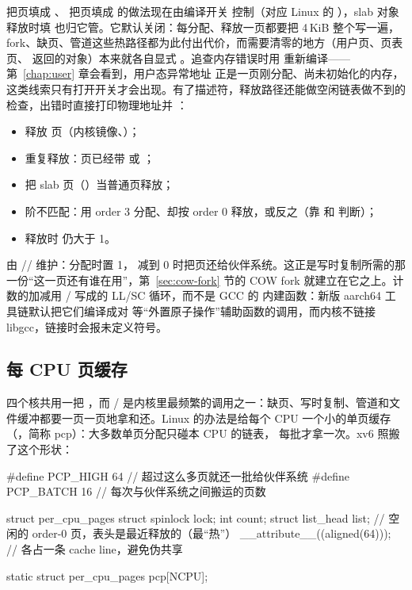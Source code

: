  把页填成 、 把页填成  的做法现在由编译开关  控制（对应 Linux 的 ），slab 对象释放时填  也归它管。它默认关闭：每分配、释放一页都要把 4\,KiB 整个写一遍，fork、缺页、管道这些热路径都为此付出代价，而需要清零的地方（用户页、页表页、 返回的对象）本来就各自显式 。追查内存错误时用  重新编译——第~\ref{chap:user} 章会看到，用户态异常地址  正是一页刚分配、尚未初始化的内存，这类线索只有打开开关才会出现。有了描述符，释放路径还能做空闲链表做不到的检查，出错时直接打印物理地址并 ：

\begin{itemize}
  \item 释放  页（内核镜像、）；
  \item 重复释放：页已经带  或 ；
  \item 把 slab 页（）当普通页释放；
  \item 阶不匹配：用 order 3 分配、却按 order 0 释放，或反之（靠  和  判断）；
  \item 释放时  仍大于 1。
\end{itemize}

 由 // 维护：分配时置 1， 减到 0 时把页还给伙伴系统。这正是写时复制所需的那一份“这一页还有谁在用”，第~\ref{sec:cow-fork} 节的 COW fork 就建立在它之上。计数的加减用 / 写成的 LL/SC 循环，而不是 GCC 的  内建函数：新版 aarch64 工具链默认把它们编译成对  等“外置原子操作”辅助函数的调用，而内核不链接 libgcc，链接时会报未定义符号。

\subsection{每 CPU 页缓存}
\label{sec:pcp}

四个核共用一把 ，而 / 是内核里最频繁的调用之一：缺页、写时复制、管道和文件缓冲都要一页一页地拿和还。Linux 的办法是给每个 CPU 一个小的单页缓存（，简称 pcp）：大多数单页分配只碰本 CPU 的链表， 每批才拿一次。xv6 照搬了这个形状：

\begin{ccode}
#define PCP_HIGH  64            // 超过这么多页就还一批给伙伴系统
#define PCP_BATCH 16            // 每次与伙伴系统之间搬运的页数

struct per_cpu_pages {
  struct spinlock lock;
  int count;
  struct list_head list;        // 空闲的 order-0 页，表头是最近释放的（最“热”）
} __attribute__((aligned(64))); // 各占一条 cache line，避免伪共享

static struct per_cpu_pages pcp[NCPU];
\end{ccode}

